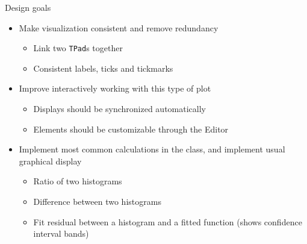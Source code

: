 \documentclass{beamer}
\begin{document}
\begin{frame}[t]{Design goals}
  \begin{itemize}
    \item Make visualization consistent and remove redundancy
    \begin{itemize}
      \item Link two \texttt{TPad}s together
      \item Consistent labels, ticks and tickmarks
    \end{itemize}
    \item Improve interactively working with this type of plot
    \begin{itemize}
      \item Displays should be synchronized automatically
      \item Elements should be customizable through the Editor
    \end{itemize}
    \item Implement most common calculations in the class, and implement usual graphical display
    \begin{itemize}
      \item Ratio of two histograms
      \item Difference between two histograms
      \item Fit residual between a histogram and a fitted function (shows confidence interval bands)
    \end{itemize}
  \end{itemize}  
\end{frame}
\end{document}
